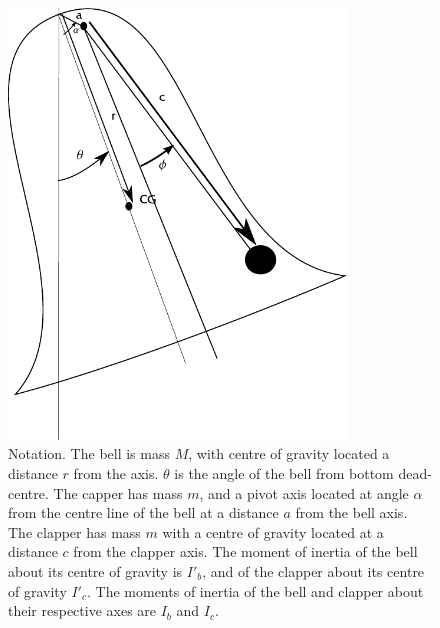 \documentclass{article}
\begin{document}
\begin{figure}
\begin{centering}
\includegraphics[width=0.8\textwidth]{bellfigure.pdf}\par
\end{centering}
\caption{Notation.  The bell is mass $M$, with centre of gravity located a distance $r$ from
the axis. $\theta$ is the angle of the bell from bottom dead-centre.
The capper has mass $m$, and a pivot axis located at angle $\alpha$ from the centre line of the bell
at a distance $a$ from the bell axis. The clapper has mass $m$ with a centre of gravity located at
a distance $c$ from the clapper axis.  The moment of inertia of the bell about its centre of gravity is
$I'_b$, and of the clapper about its centre of gravity $I'_c$. The moments of inertia of the bell
and clapper about their respective axes are $I_b$ and $I_c$.}
\label{fig:bell}
\end{figure}
\end{document}
